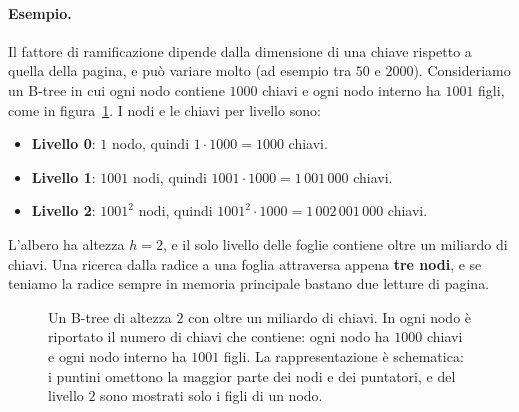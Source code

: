 \paragraph{Esempio.}
Il fattore di ramificazione dipende dalla dimensione di una chiave rispetto a quella della pagina, e può variare molto (ad esempio tra $50$ e $2000$). Consideriamo un B-tree in cui ogni nodo contiene $1000$ chiavi e ogni nodo interno ha $1001$ figli, come in figura~\ref{fig:btree-1001}. I nodi e le chiavi per livello sono:
\begin{itemize}
    \item \textbf{Livello 0}: $1$ nodo, quindi $1 \cdot 1000 = 1000$ chiavi.
    \item \textbf{Livello 1}: $1001$ nodi, quindi $1001 \cdot 1000 = 1\,001\,000$ chiavi.
    \item \textbf{Livello 2}: $1001^2$ nodi, quindi $1001^2 \cdot 1000 = 1\,002\,001\,000$ chiavi.
\end{itemize}
L'albero ha altezza $h = 2$, e il solo livello delle foglie contiene oltre un miliardo di chiavi. Una ricerca dalla radice a una foglia attraversa appena \textbf{tre nodi}, e se teniamo la radice sempre in memoria principale bastano due letture di pagina.

\begin{figure}[htbp]
\centering
{}
\caption{Un B-tree di altezza $2$ con oltre un miliardo di chiavi. In ogni nodo è riportato il numero di chiavi che contiene: ogni nodo ha $1000$ chiavi e ogni nodo interno ha $1001$ figli. La rappresentazione è schematica: i puntini omettono la maggior parte dei nodi e dei puntatori, e del livello $2$ sono mostrati solo i figli di un nodo.}
\label{fig:btree-1001}
\end{figure}

